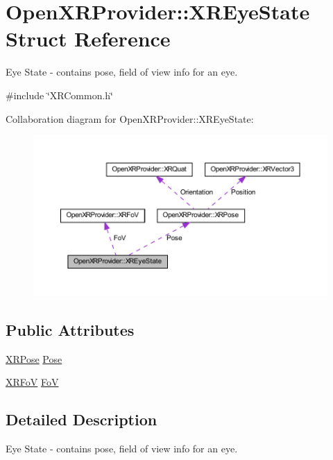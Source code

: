 \hypertarget{struct_open_x_r_provider_1_1_x_r_eye_state}{}\section{Open\+X\+R\+Provider\+::X\+R\+Eye\+State Struct Reference}
\label{struct_open_x_r_provider_1_1_x_r_eye_state}


Eye State -\/ contains pose, field of view info for an eye.  




{\ttfamily \#include \char`\"{}X\+R\+Common.\+h\char`\"{}}



Collaboration diagram for Open\+X\+R\+Provider\+::X\+R\+Eye\+State\+:\nopagebreak
\begin{figure}[H]
\begin{center}
\leavevmode
\includegraphics[width=350pt]{struct_open_x_r_provider_1_1_x_r_eye_state__coll__graph}
\end{center}
\end{figure}
\subsection*{Public Attributes}
\begin{DoxyCompactItemize}
\item 
\mbox{\hyperlink{struct_open_x_r_provider_1_1_x_r_pose}{X\+R\+Pose}} \mbox{\hyperlink{struct_open_x_r_provider_1_1_x_r_eye_state_abd91b3f6fae38565d7caf0ec4b40a0c3}{Pose}}
\item 
\mbox{\hyperlink{struct_open_x_r_provider_1_1_x_r_fo_v}{X\+R\+FoV}} \mbox{\hyperlink{struct_open_x_r_provider_1_1_x_r_eye_state_a2f8fa57fe220846f33ceed97f6c7cc0f}{FoV}}
\end{DoxyCompactItemize}


\subsection{Detailed Description}
Eye State -\/ contains pose, field of view info for an eye. 

